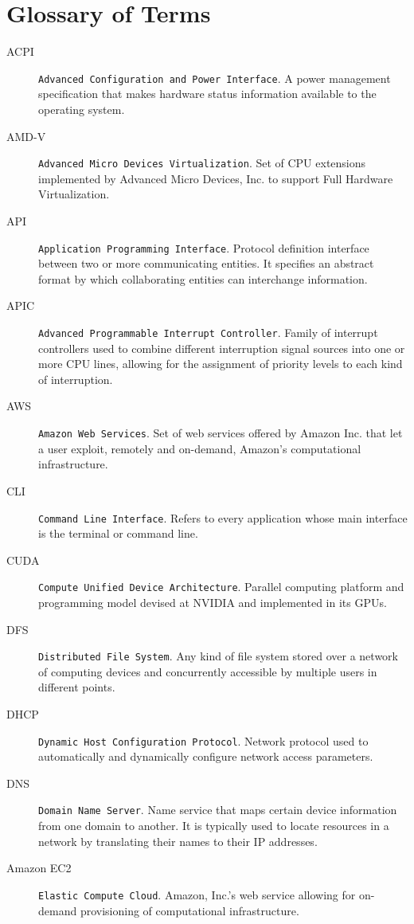 \chapter{Glossary of Terms}\label{cap:glosario}
\begin{description}
\item[ACPI] \texttt{Advanced Configuration and Power Interface}. A power management specification that makes hardware status information available to the operating system.
\item[AMD-V] \texttt{Advanced Micro Devices Virtualization}. Set of CPU extensions implemented by Advanced Micro Devices, Inc. to support Full Hardware Virtualization.
\item[API] \texttt{Application Programming Interface}. Protocol definition interface between two or more communicating entities. It specifies an abstract format by which collaborating entities can interchange information.
\item[APIC] \texttt{Advanced Programmable Interrupt Controller}. Family of interrupt controllers used to combine different interruption signal sources into one or more CPU lines, allowing for the assignment of priority levels to each kind of interruption.
\item[AWS] \texttt{Amazon Web Services}. Set of web services offered by Amazon Inc. that let a user exploit, remotely and on-demand, Amazon's computational infrastructure.
\item[CLI] \texttt{Command Line Interface}. Refers to every application whose main interface is the terminal or command line.
\item[CUDA] \texttt{Compute Unified Device Architecture}. Parallel computing platform and programming model devised at NVIDIA and implemented in its GPUs.
\item[DFS] \texttt{Distributed File System}. Any kind of file system stored over a network of computing devices and concurrently accessible by multiple users in different points.
\item[DHCP] \texttt{Dynamic Host Configuration Protocol}. Network protocol used to automatically and dynamically configure network access parameters.
\item[DNS] \texttt{Domain Name Server}. Name service that maps certain device information from one domain to another. It is typically used to locate resources in a network by translating their names to their IP addresses.
\item[Amazon EC2] \texttt{Elastic Compute Cloud}. Amazon, Inc.'s web service allowing for on-demand provisioning of computational infrastructure.

\end{description}
